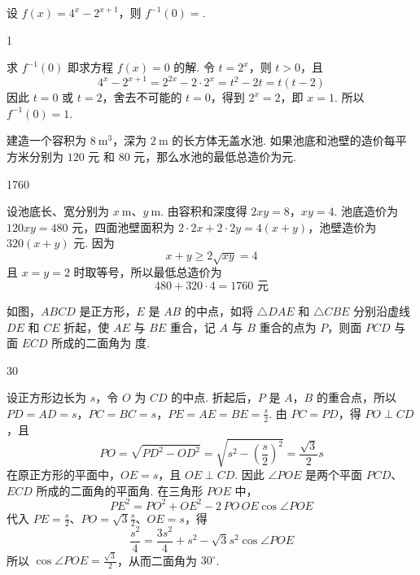 \begin{problem}
设 \(f(x)=4^x-2^{x+1}\)，则 \(f^{-1}(0)=\)\fillinblank{}.
\end{problem}

\begin{answer}
1
\end{answer}

\begin{solution}
求 \(f^{-1}(0)\) 即求方程 \(f(x)=0\) 的解. 令 \(t=2^x\)，则 \(t>0\)，且
\[
4^x-2^{x+1}=2^{2x}-2\cdot2^x=t^2-2t=t(t-2)
\]
因此 \(t=0\) 或 \(t=2\)，舍去不可能的 \(t=0\)，得到 \(2^x=2\)，即 \(x=1\). 所以 \(f^{-1}(0)=1\).
\end{solution}

\begin{problem}
建造一个容积为 \(8\mathrm{~m}^3\)，深为 \(2\mathrm{~m}\) 的长方体无盖水池. 如果池底和池壁的造价每平方米分别为 \(120\text{ 元}\) 和 \(80\text{ 元}\)，那么水池的最低总造价为\fillinblank{}\(\text{元}\).
\end{problem}

\begin{answer}
1760
\end{answer}

\begin{solution}
设池底长、宽分别为 \(x\mathrm{~m}\)、\(y\mathrm{~m}\). 由容积和深度得
\(2xy=8\)，\(xy=4\).
池底造价为 \(120xy=480\) 元，四面池壁面积为 \(2\cdot2x+2\cdot2y=4(x+y)\)，池壁造价为 \(320(x+y)\) 元. 因为
\[
x+y\geq2\sqrt{xy}=4
\]
且 \(x=y=2\) 时取等号，所以最低总造价为
\[
480+320\cdot4=1760\text{ 元}
\]
\end{solution}

\begin{problem}
如图，\(ABCD\) 是正方形，\(E\) 是 \(AB\) 的中点，如将 \(\triangle DAE\) 和 \(\triangle CBE\) 分别沿虚线 \(DE\) 和 \(CE\) 折起，使 \(AE\) 与 \(BE\) 重合，记 \(A\) 与 \(B\) 重合的点为 \(P\)，则面 \(PCD\) 与面 \(ECD\) 所成的二面角为\fillinblank{} 度.

\end{problem}

\begin{answer}
30
\end{answer}

\begin{solution}
设正方形边长为 \(s\)，令 \(O\) 为 \(CD\) 的中点. 折起后，\(P\) 是 \(A\)，\(B\) 的重合点，所以
\(PD=AD=s\)，\(PC=BC=s\)，\(PE=AE=BE=\frac s2\).
由 \(PC=PD\)，得 \(PO\perp CD\)，且
\[
PO=\sqrt{PD^2-OD^2}=\sqrt{s^2-\left(\frac s2\right)^2}=\frac{\sqrt3}{2}s
\]
在原正方形的平面中，\(OE=s\)，且 \(OE\perp CD\). 因此 \(\angle POE\) 是两个平面 \(PCD\)、\(ECD\) 所成的二面角的平面角. 在三角形 \(POE\) 中，
\[
PE^2=PO^2+OE^2-2\,PO\,OE\cos\angle POE
\]
代入 \(PE=\frac{s}{2}\)、\(PO=\sqrt3\frac{s}{2}\)、\(OE=s\)，得
\[
\frac{s^2}{4}=\frac{3s^2}{4}+s^2-\sqrt3s^2\cos\angle POE
\]
所以 \(\cos\angle POE=\frac{\sqrt3}{2}\)，从而二面角为 \(30^\circ\).
\end{solution}

